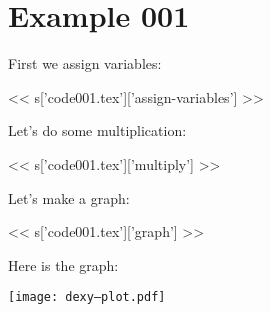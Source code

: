 \section{Example 001}

First we assign variables:

<< s['code001.tex']['assign-variables'] >>

Let's do some multiplication:

<< s['code001.tex']['multiply'] >>

Let's make a graph:

<< s['code001.tex']['graph'] >>

Here is the graph:

\texttt{[image: dexy--plot.pdf]}

